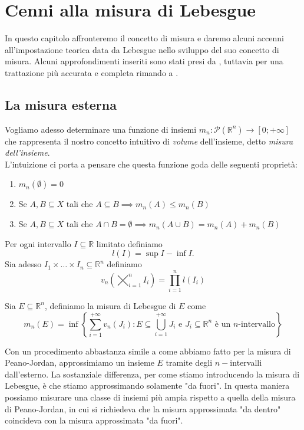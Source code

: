 \chapter{Cenni alla misura di Lebesgue}

In questo capitolo affronteremo il concetto di misura e daremo alcuni accenni all'impostazione teorica data da Lebesgue nello sviluppo
del suo concetto di misura. Alcuni approfondimenti inseriti sono stati presi da \cite{rudin}, tuttavia per una trattazione più accurata e completa rimando a \cite{measure_theory}.

\section{La misura esterna}
Vogliamo adesso determinare una funzione di insiemi $m_n: \mathcal{P}(\mathbb{R}^n) \to [0; +\infty]$ che rappresenta il nostro concetto intuitivo di \emph{volume} dell'insieme, detto \emph{misura dell'insieme}. \\
L'intuizione ci porta a pensare che questa funzione goda delle seguenti proprietà:
\begin{enumerate}[label=\protect\circled{\arabic*}]
	\item $m_n(\emptyset) = 0$
	\item Se $A, B \subseteq X$ tali che $A \subseteq B \implies m_n(A) \leq m_n(B)$
	\item Se $A, B \subseteq X$ tali che $A \cap B = \emptyset \implies m_n(A \cup B) = m_n(A) + m_n(B)$
\end{enumerate}
\begin{definition}
	Per ogni intervallo $I \subseteq \mathbb{R}$ limitato definiamo
	$$
	\mathit{l}(I) = \sup{I} - \inf{I}.
	$$
	Sia adesso $I_1 \times \ldots \times I_n \subseteq \mathbb{R}^n$ definiamo
	$$
		v_n \left( \varprod_{i=1}^n I_i \right) = \prod_{i=1}^n \mathit{l}(I_i) 
	$$
\end{definition}
\begin{definition}
	Sia $E \subseteq \mathbb{R}^n$, definiamo la misura di Lebesgue di $E$ come
	\begin{equation}
		m_n(E) = \inf \left\{ \sum_{i=1}^{+\infty} v_n(J_i) : E \subseteq \bigcup_{i=1}^{+\infty} J_i \text{ e } J_i \subseteq \mathbb{R}^n \text{ è un } n\text{-intervallo} \right\}
		\label{eq:def_lebesgue}
	\end{equation}
\end{definition}
\begin{remark}
	Con un procedimento abbastanza simile a come abbiamo fatto per la misura di Peano-Jordan, approssimiamo un insieme $E$ tramite degli $n-$intervalli dall'esterno. La sostanziale differenza, per come stiamo introducendo la misura di Lebesgue, è che stiamo approssimando solamente "da fuori".
	In questa maniera possiamo misurare una classe di insiemi più ampia rispetto a quella della misura di Peano-Jordan, in cui si richiedeva che la misura approssimata "da dentro" coincideva con la misura approssimata "da fuori".
\end{remark}
